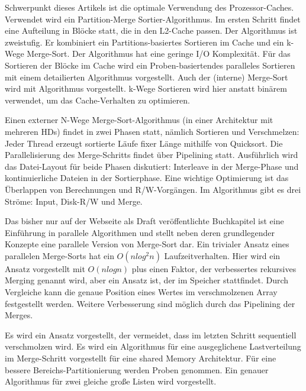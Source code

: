 \documentclass[a4paper,12pt,twoside]{article}
\begin{document}
\textbf{}

Schwerpunkt dieses Artikels ist die optimale Verwendung des Prozessor-Caches. Verwendet wird ein Partition-Merge Sortier-Algorithmus. Im ersten Schritt findet eine Aufteilung in Blöcke statt, die in den L2-Cache passen. Der Algorithmus ist zweistufig. Er kombiniert ein Partitions-basiertes Sortieren im Cache und ein k-Wege Merge-Sort. Der Algorithmus hat eine geringe I/O Komplexität. Für das Sortieren der Blöcke im Cache wird ein Proben-basiertendes paralleles Sortieren mit einem detailierten Algorithmus vorgestellt. Auch der (interne) Merge-Sort wird mit Algorithmus vorgestellt. k-Wege Sortieren wird hier anstatt binärem verwendet, um das Cache-Verhalten zu optimieren.

\textbf{}

Einen externer N-Wege Merge-Sort-Algorithmus (in einer Architektur mit mehreren HDs) findet in zwei Phasen statt, nämlich Sortieren und Verschmelzen: Jeder Thread erzeugt sortierte Läufe fixer Länge mithilfe von Quicksort. Die Parallelisierung des Merge-Schritts findet über Pipelining statt. Ausführlich wird das Datei-Layout für beide Phasen diskutiert: Interleave in der Merge-Phase und kontinuierliche Dateien in der Sortierphase. Eine wichtige Optimierung ist das Überlappen von Berechnungen und R/W-Vorgängen. Im Algorithmus gibt es drei Ströme: Input, Disk-R/W und Merge. 

\textbf{}

Das bisher nur auf der Webseite als Draft veröffentlichte Buchkapitel ist eine Einführung in parallele Algorithmen und stellt neben deren grundlegender Konzepte eine parallele Version von Merge-Sort dar. Ein trivialer Ansatz eines parallelen Merge-Sorts hat ein $O(n log^{2} n)$ Laufzeitverhalten. Hier wird ein Ansatz vorgestellt mit $O(n log n)$ plus einen Faktor, der verbessertes rekursives Merging genannt wird, aber ein Ansatz ist, der im Speicher stattfindet. Durch Vergleiche kann die genaue Position eines Wertes im verschmolzenen Array festgestellt werden. Weitere Verbesserung sind möglich durch das Pipelining der Merges.

\textbf{}

Es wird ein Ansatz vorgestellt, der vermeidet, dass im letzten Schritt sequentiell verschmolzen wird. Es wird ein Algorithmus für eine ausgeglichene Lastverteilung im Merge-Schritt vorgestellt für eine shared Memory Architektur. Für eine bessere Bereichs-Partitionierung werden Proben genommen. Ein genauer Algorithmus für zwei gleiche große Listen wird vorgestellt. 
\end{document}
